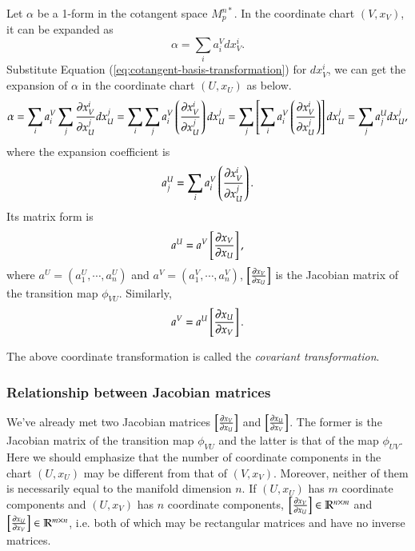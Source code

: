 \documentclass[11pt, a4paper]{book}
\begin{document}
Let $\alpha$ be a 1-form in the cotangent space $M_p^{n*}$. In the coordinate chart
$(V,x_V)$, it can be expanded as
\begin{equation*}
  \alpha = \sum_i a_i^V dx_V^i.
\end{equation*}
Substitute Equation (\ref{eq:cotangent-basis-transformation}) for $dx_V^i$, we can get the
expansion of $\alpha$ in the coordinate chart $(U,x_U)$ as below.
\begin{equation*}
  \alpha = \sum_i a_i^V \sum_j \frac{\partial x_V^i}{\partial x_U^j} dx_U^j = \sum_i\sum_j
  a_i^V \left( \frac{\partial x_V^i}{\partial x_U^j} \right) dx_U^j = \sum_j \left[ \sum_i
    a_i^V \left( \frac{\partial x_V^i}{\partial x_U^j} \right) \right] dx_U^j = \sum_j a_j^U dx_U^j,
\end{equation*}
where the expansion coefficient is
\begin{equation*}
  \label{eq:covector-transformation}
  a_j^U = \sum_i a_i^V \left( \frac{\partial x_V^i}{\partial x_U^j} \right).
\end{equation*}
Its matrix form is
\begin{equation}
  a^U = a^V \left[ \frac{\partial x_V}{\partial x_U} \right],
\end{equation}
where $a^U = (a_1^U,\cdots,a_n^U)$ and $a^V = (a_1^V,\cdots,a_n^V)$,
$\left[ \frac{\partial x_V}{\partial x_U} \right]$ is the Jacobian matrix of the transition map
$\phi_{VU}$. Similarly,
\begin{equation}
a^V = a^U \left[ \frac{\partial x_U}{\partial x_V} \right].
\end{equation}

The above coordinate transformation is called the \emph{covariant transformation}.

\subsubsection{Relationship between Jacobian matrices}

We've already met two Jacobian matrices $\left[ \frac{\partial x_V}{\partial x_U} \right]$ and
$\left[ \frac{\partial x_U}{\partial x_V} \right]$. The former is the Jacobian matrix of the
transition map $\phi_{VU}$ and the latter is that of the map $\phi_{UV}$. Here we should
emphasize that the number of coordinate components in the chart $(U,x_U)$ may be different
from that of $(V,x_V)$. Moreover, neither of them is necessarily equal to the manifold
dimension $n$. If $(U,x_U)$ has $m$ coordinate components and $(U,x_V)$ has $n$ coordinate
components, $\left[ \frac{\partial x_V}{\partial x_U} \right] \in \mathbb{R}^{n\times m}$ and
$\left[ \frac{\partial x_U}{\partial x_V} \right]\in \mathbb{R}^{m\times n}$, i.e. both of
which may be rectangular matrices and have no inverse matrices.
\end{document}
